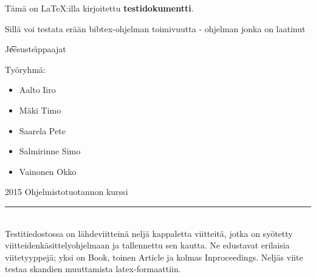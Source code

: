 \documentclass[a4paper,12pt]{article}
\begin{document}
Tämä on \LaTeX:illa kirjoitettu \textbf{testidokumentti}.

Sillä voi testata erään bibtex-ohjelman toimivuutta - ohjelman jonka on laatinut\\ 
\begin{center}{ 
{\huge J\t{ee}suste\r{\i}ppaajat}
\\
}\end{center}

 Työryhmä: 
 \begin{itemize}
    \item
       Aalto Iiro
    \item 
       Mäki Timo
    \item 
       Saarela Pete
    \item
       Salmirinne Simo
    \item
       Vainonen Okko
 \end{itemize}

 2015 Ohjelmistotuotannon kurssi\\[1cm]
\noindent\rule{14cm}{0.4pt}\\[1cm]
Testitiedostossa on lähdeviitteinä neljä kappaletta viitteitä, jotka on syötetty viitteidenkäsittelyohjelmaan ja tallennettu sen kautta. Ne edustavat erilaisia viitetyyppejä; yksi on Book\cite{BA04}, toinen Article\cite{W04} ja kolmas Inproceedings\cite{VPL11}. Neljäs viite\cite{TEST} testaa skandien muuttamista latex-formaattiin.


{}

\end{document}
